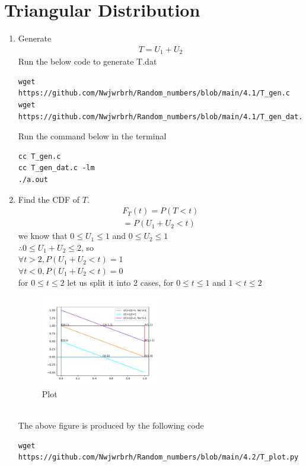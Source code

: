 \documentclass[journal,12pt,twocolumn]{IEEEtran}
\renewcommand\thesection{\arabic{section}}
\begin{document}
\section{Triangular Distribution}
\begin{enumerate}[label=\thesection.\arabic*
,ref=\thesection.\theenumi]
%
\item Generate 
	\begin{align}
		T = U_1+U_2
	\end{align}
\solution 
Run the below code to generate T.dat
\begin{lstlisting}
wget https://github.com/Nwjwrbrh/Random_numbers/blob/main/4.1/T_gen.c
wget https://github.com/Nwjwrbrh/Random_numbers/blob/main/4.1/T_gen_dat.c
\end{lstlisting}
Run the command below in the terminal 
\begin{lstlisting}
cc T_gen.c
cc T_gen_dat.c -lm
./a.out
\end{lstlisting}
\item Find the CDF of $T$.
\begin{align}
F_{T}(t)=P(T<t)
\\=P(U_1 +U_2 <t)
\end{align}
we know that $0\leq U_1 \leq 1$ and $0\leq U_2 \leq 1$\\
$\therefore 0\leq U_1 + U_2 \leq 2$, so\\
 $\forall t>2, P(U_1 +U_2 <t)=1$\\
 $\forall t<0, P(U_1 +U_2 <t)=0$\\
   for $0\leq t \leq 2$ let us split it into 2 cases, for $0 \leq t\leq 1$ and $1 <t \leq2$\\
\begin{figure}[h]
\includegraphics[width=0.5\textwidth]{../4.2/T_plot.pdf}
\caption{Plot}
\label{fig:T_plot}
\end{figure}
\\
The above figure is produced by the following code
\begin{lstlisting}
wget https://github.com/Nwjwrbrh/Random_numbers/blob/main/4.2/T_plot.py

\end{lstlisting}
\end{enumerate}
\end{document}
